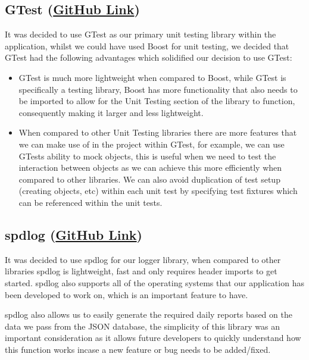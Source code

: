 \documentclass[
  english,
  a4paper,
,tablecaptionabove
]{scrartcl}
\providecommand{\tightlist}{%
  \setlength{\itemsep}{0pt}\setlength{\parskip}{0pt}}
\begin{document}
\hypertarget{gtest-github-link}{%
\subsection{\texorpdfstring{GTest
(\href{https://github.com/google/googletest}{GitHub
Link})}{GTest (GitHub Link)}}\label{gtest-github-link}}

It was decided to use GTest as our primary unit testing library within
the application, whilst we could have used Boost for unit testing, we
decided that GTest had the following advantages which solidified our
decision to use GTest:

\begin{itemize}
\tightlist
\item
  GTest is much more lightweight when compared to Boost, while GTest is
  specifically a testing library, Boost has more functionality that also
  needs to be imported to allow for the Unit Testing section of the
  library to function, consequently making it larger and less
  lightweight.
\item
  When compared to other Unit Testing libraries there are more features
  that we can make use of in the project within GTest, for example, we
  can use GTests ability to mock objects, this is useful when we need to
  test the interaction between objects as we can achieve this more
  efficiently when compared to other libraries. We can also avoid
  duplication of test setup (creating objects, etc) within each unit
  test by specifying test fixtures which can be referenced within the
  unit tests.
\end{itemize}

\hypertarget{spdlog-github-link}{%
\subsection{\texorpdfstring{spdlog
(\href{https://github.com/gabime/spdlog}{GitHub
Link})}{spdlog (GitHub Link)}}\label{spdlog-github-link}}

It was decided to use spdlog for our logger library, when compared to
other libraries spdlog is lightweight, fast and only requires header
imports to get started. spdlog also supports all of the operating
systems that our application has been developed to work on, which is an
important feature to have.

spdlog also allows us to easily generate the required daily reports
based on the data we pass from the JSON database, the simplicity of this
library was an important consideration as it allows future developers to
quickly understand how this function works incase a new feature or bug
needs to be added/fixed.
\end{document}
